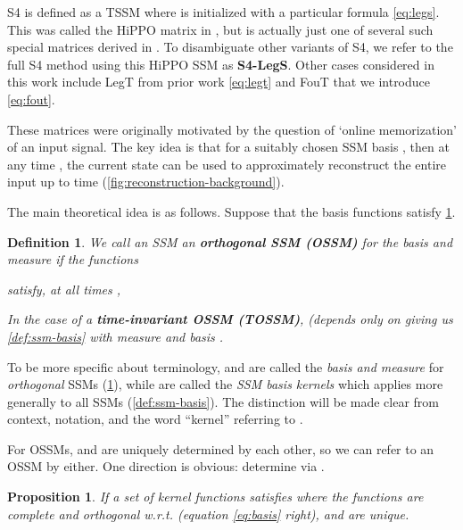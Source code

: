 \documentclass{article}
\newtheorem{proposition}[theorem]{Proposition}
\newtheorem{definition}{Definition}
\begin{document}
S4 is defined as a TSSM where  is initialized with a particular formula \eqref{eq:legs}.
This was called the HiPPO matrix in \citep{gu2022efficiently}, but is actually just one of several such special matrices derived in \citep{gu2020hippo}.
To disambiguate other variants of S4, we refer to the full S4 method using this HiPPO SSM as \textbf{S4-LegS}.
Other cases considered in this work include LegT from prior work \eqref{eq:legt} and FouT that we introduce \eqref{eq:fout}.

\begin{minipage}{0.5\linewidth}
  \small


\end{minipage}
\hfill
\begin{minipage}{0.5\linewidth}
  \small

\end{minipage}

These matrices were originally motivated by the question of `online memorization' of an input signal.
The key idea is that for a suitably chosen SSM basis , then at any time , the current state  can be used to approximately reconstruct the entire input  up to time  (\cref{fig:reconstruction-background}).

The main theoretical idea is as follows.
Suppose that the basis functions satisfy \cref{def:hippo}.
\begin{definition}\label{def:hippo}
  We call an SSM  an \textbf{orthogonal SSM (OSSM)} for the basis 
  and measure  if the functions
  
  satisfy, at all times ,
  
  In the case of a \textbf{time-invariant OSSM (TOSSM)},  (depends only on  giving us \cref{def:ssm-basis} with measure  and basis .
\end{definition}


To be more specific about terminology,  and  are called the \emph{basis and measure} for \emph{orthogonal} SSMs (\cref{def:hippo}), while  are called the \emph{SSM basis kernels} which applies more generally to all SSMs (\cref{def:ssm-basis}).
The distinction will be made clear from context, notation, and the word ``kernel'' referring to .

For OSSMs,  and  are uniquely determined by each other, so we can refer to an OSSM by either. One direction is obvious:  determine  via .
\begin{proposition}\label{prop:basis-uniqueness}
  If a set of kernel functions satisfies  where the functions  are complete and orthogonal w.r.t.  (equation \eqref{eq:basis} right),  and  are unique.
\end{proposition}
\end{document}
